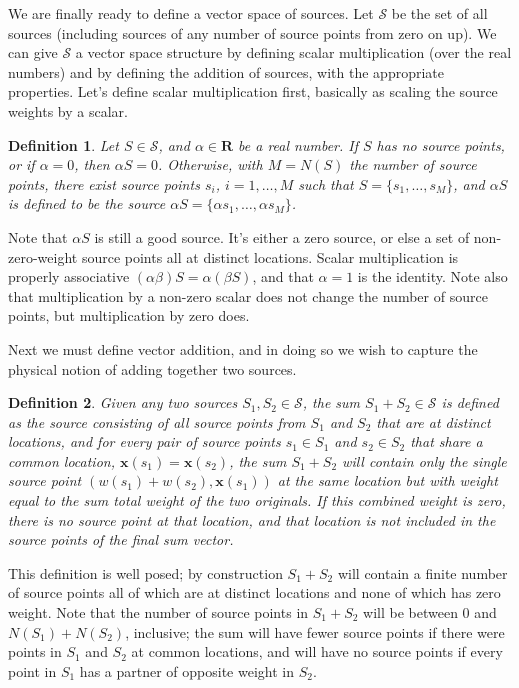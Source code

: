 \documentclass[12pt]{article}
\newtheorem{definition}{Definition}
\begin{document}
We are finally ready to define a vector space of sources.
Let $\mathcal{S}$ be the set of all sources (including sources of any number of source points from zero on up).  
We can give $\mathcal{S}$ a vector space structure by defining scalar multiplication (over the real numbers) and by defining the addition of sources, with the appropriate properties.  Let's define scalar multiplication first, basically as scaling the source weights by a scalar.
\begin{definition}
Let $S \in \mathcal{S}$, and $\alpha \in \mathbf{R}$ be a real number.  If $S$ has no source points, or if $\alpha = 0$, then $\alpha S = 0$.   Otherwise, with $M = N(S)$ the number of source points, there exist source points $s_i$, $i = 1, \ldots, M$ such that $S = \{s_1, \ldots, s_M\}$, and $\alpha S$ is defined to be the source $\alpha S = \{\alpha s_1, \ldots, \alpha s_M\}$.
\end{definition}
Note that $\alpha S$ is still a good source.  It's either a zero source, or else a set of non-zero-weight source points all at distinct locations.  Scalar multiplication is properly associative $(\alpha \beta) S = \alpha (\beta S)$, and that $\alpha = 1$ is the identity.  Note also that multiplication by a non-zero scalar does not change the number of source points, but multiplication by zero does.

Next we must define vector addition, and in doing so we wish to capture the physical notion of adding together two sources.
\begin{definition}
Given any two sources $S_1, S_2 \in \mathcal{S}$, the sum $S_1 + S_2 \in \mathcal{S}$ is defined as the source consisting of all source points from $S_1$ and $S_2$ that are at distinct locations, and for every pair of source points $s_1 \in S_1$ and $s_2 \in S_2$ that share a common location, $\mathbf{x}(s_1) = \mathbf{x}(s_2)$, the sum $S_1 + S_2$ will contain only the single source point $(w(s_1) + w(s_2), \mathbf{x}(s_1))$ at the same location but with weight equal to the sum total weight of the two originals.  If this combined weight is zero, there is no source point at that location, and that location is not included in the source points of the final sum vector.
\end{definition}
This definition is well posed; by construction $S_1 + S_2$ will contain a finite number of source points all of which are at distinct locations and none of which has zero weight.  Note that the number of source points in $S_1 + S_2$ will be between 0 and $N(S_1) + N(S_2)$, inclusive; the sum will have fewer source points if there were points in $S_1$ and $S_2$ at common locations, and will have no source points if every point in $S_1$ has a partner of opposite weight in $S_2$.
\end{document}
